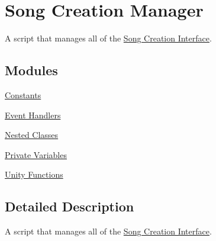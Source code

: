 \hypertarget{group___doc_s_c_m}{}\section{Song Creation Manager}
\label{group___doc_s_c_m}


A script that manages all of the \hyperlink{group___doc_s_c}{Song Creation Interface}.  


\subsection*{Modules}
\begin{DoxyCompactItemize}
\item 
\hyperlink{group___s_c_m_const}{Constants}
\item 
\hyperlink{group___s_c_m_handlers}{Event Handlers}
\item 
\hyperlink{group___s_c_m_nest_class}{Nested Classes}
\item 
\hyperlink{group___s_c_m_priv_var}{Private Variables}
\item 
\hyperlink{group___s_c_m_unity}{Unity Functions}
\end{DoxyCompactItemize}


\subsection{Detailed Description}
A script that manages all of the \hyperlink{group___doc_s_c}{Song Creation Interface}. 


